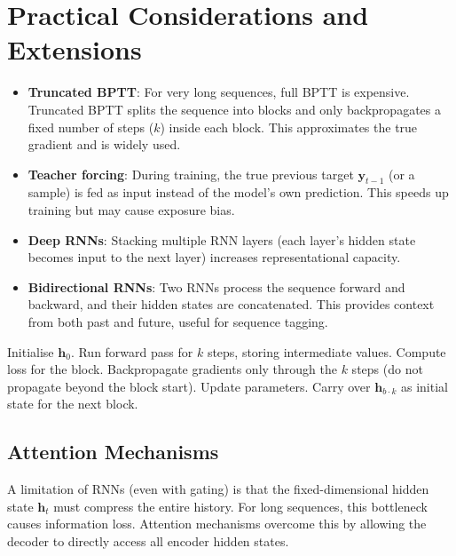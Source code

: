 \documentclass{tufte-handout}
\begin{document}
\section{Practical Considerations and Extensions}

\begin{itemize}
    \item \textbf{Truncated BPTT}: For very long sequences, full BPTT is expensive. Truncated BPTT splits the sequence into blocks and only backpropagates a fixed number of steps ($k$) inside each block. This approximates the true gradient and is widely used.
    \item \textbf{Teacher forcing}: During training, the true previous target $\mathbf{y}_{t-1}$ (or a sample) is fed as input instead of the model’s own prediction. This speeds up training but may cause exposure bias.
    \item \textbf{Deep RNNs}: Stacking multiple RNN layers (each layer’s hidden state becomes input to the next layer) increases representational capacity.
    \item \textbf{Bidirectional RNNs}: Two RNNs process the sequence forward and backward, and their hidden states are concatenated. This provides context from both past and future, useful for sequence tagging.
\end{itemize}

\begin{algorithm}[h]
    \caption{Truncated BPTT (with block size $k$)}
    \begin{algorithmic}[1]
        \State Initialise $\mathbf{h}_0$.
            \State Run forward pass for $k$ steps, storing intermediate values.
            \State Compute loss for the block.
            \State Backpropagate gradients only through the $k$ steps (do not propagate beyond the block start).
            \State Update parameters.
            \State Carry over $\mathbf{h}_{b \cdot k}$ as initial state for the next block.
        \EndFor
    \end{algorithmic}
\end{algorithm}

\subsection{Attention Mechanisms}

A limitation of RNNs (even with gating) is that the fixed-dimensional hidden state $\mathbf{h}_t$ must compress the entire history. For long sequences, this bottleneck causes information loss. Attention mechanisms overcome this by allowing the decoder to directly access all encoder hidden states.
\end{document}
